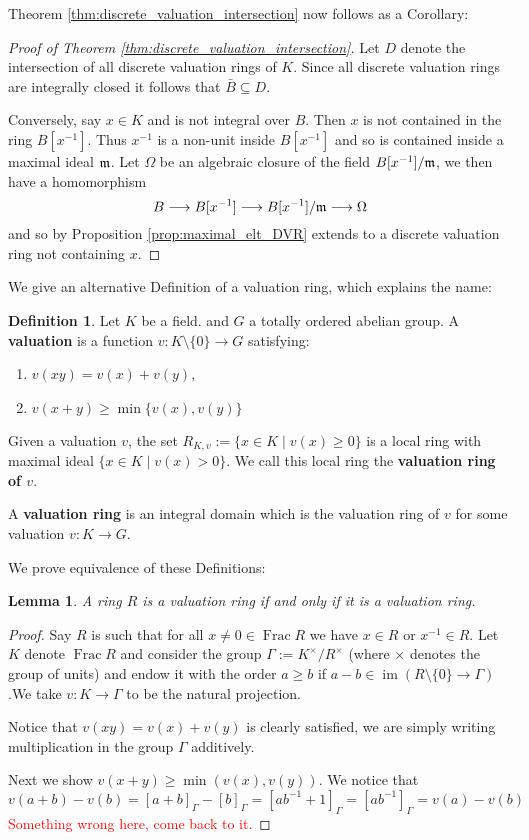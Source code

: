 \documentclass[12pt]{article}
\theoremstyle{plain}
\newtheorem{lemma}[thm]{Lemma}
\theoremstyle{definition}
\newtheorem{defn}[thm]{Definition} %
\newcommand{\lto}{\longrightarrow}
\begin{document}
Theorem \ref{thm:discrete_valuation_intersection} now follows as a Corollary:
\begin{proof}[Proof of Theorem \ref{thm:discrete_valuation_intersection}]
Let $D$ denote the intersection of all discrete valuation rings of $K$. Since all discrete valuation rings are integrally closed it follows that $\bar{B} \subseteq D$.

Conversely, say $x \in K$ and is not integral over $B$. Then $x$ is not contained in the ring $B[x^{-1}]$. Thus $x^{-1}$ is a non-unit inside $B[x^{-1}]$ and so is contained inside a maximal ideal $\frak{m}$. Let $\Omega$ be an algebraic closure of the field $B[x^{-1}]/\frak{m}$, we then have a homomorphism \[B \lto B[x^{-1}] \lto B[x^{-1}]/\frak{m} \lto \Omega\]
and so by Proposition \ref{prop:maximal_elt_DVR} extends to a discrete valuation ring not containing $x$.
\end{proof}
We give an alternative Definition of a valuation ring, which explains the name:
\begin{defn}
Let $K$ be a field. and $G$ a totally ordered abelian group. A \textbf{valuation} is a function $v: K\setminus\lbrace 0 \rbrace \lto G$ satisfying:
\begin{enumerate}
\item $v(xy) = v(x) + v(y)$,
\item $v(x + y) \geq \operatorname{min}\lbrace v(x), v(y)\rbrace$
\end{enumerate}
Given a valuation $v$, the set $R_{K,v} := \lbrace x \in K \mid v(x) \geq 0\rbrace$ is a local ring with maximal ideal $\lbrace x \in K \mid v(x) > 0 \rbrace$. We call this local ring the \textbf{valuation ring of $v$}. 

A \textbf{valuation ring} is an integral domain which is the valuation ring of $v$ for some valuation $v: K \lto G$.
\end{defn}
We prove equivalence of these Definitions:
\begin{lemma}
A ring $R$ is a valuation ring if and only if it is a valuation ring.
\end{lemma}
\begin{proof}
Say $R$ is such that for all $x \neq 0 \in \operatorname{Frac}R$ we have $x \in R$ or $x^{-1} \in R$. Let $K$ denote $\operatorname{Frac}R$ and consider the group $\Gamma := K^{\times}/R^\times$ (where $\times$ denotes the group of units) and endow it with the order $a \geq b$ if $a - b \in \operatorname{im}(R\setminus\lbrace 0 \rbrace \lto \Gamma)$.We take $v: K \lto \Gamma$ to be the natural projection. 

Notice that $v(xy) = v(x) + v(y)$ is clearly satisfied, we are simply writing multiplication in the group $\Gamma$ additively.

Next we show $v(x + y) \geq \operatorname{min}(v(x),v(y))$. We notice that
\begin{equation}
v(a + b) - v(b) = [a + b]_\Gamma - [b]_\Gamma = [ab^{-1} + 1]_\Gamma = [ab^{-1}]_\Gamma = v(a) - v(b)
\end{equation}
\textcolor{red}{Something wrong here, come back to it.}
\end{proof}
%
%
%
%
%
%
%
\end{document}
